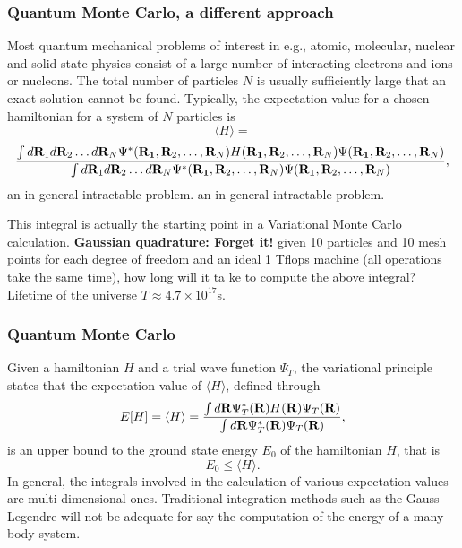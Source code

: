 \documentclass[compress]{beamer}
\begin{document}
\frame
{
  \frametitle{Quantum Monte Carlo, a different approach}
\begin{small}
{\scriptsize
Most quantum mechanical  
problems of interest in e.g., atomic, molecular, nuclear and solid state 
physics consist of a large number of 
interacting electrons and ions or nucleons. 
The total number of particles $N$ is usually sufficiently large
that an exact solution cannot be found. 
Typically, 
the expectation value for a chosen hamiltonian for a system of 
$N$ particles is
\[
   \langle H \rangle =
\]
\[
   \frac{\int d{\bf R}_1d{\bf R}_2\dots d{\bf R}_N
         \Psi^{\ast}({\bf R_1},{\bf R}_2,\dots,{\bf R}_N)
          H({\bf R_1},{\bf R}_2,\dots,{\bf R}_N)
          \Psi({\bf R_1},{\bf R}_2,\dots,{\bf R}_N)}
        {\int d{\bf R}_1d{\bf R}_2\dots d{\bf R}_N
        \Psi^{\ast}({\bf R_1},{\bf R}_2,\dots,{\bf R}_N)
        \Psi({\bf R_1},{\bf R}_2,\dots,{\bf R}_N)},
\]
an in general intractable problem.
an in general intractable problem.

 This integral is actually the starting point in a Variational Monte Carlo calculation.\newline
 {\bf Gaussian quadrature: Forget it!} given 10 particles and 10 mesh points for each degree of freedom
and an
 ideal 1 Tflops machine (all operations take the same time), how long will it ta
ke to compute the above integral? Lifetime of the universe $T\approx 4.7 \times
10^{17}$s.
}
\end{small}
}




\frame
{
  \frametitle{Quantum Monte Carlo}
\begin{small}
{\scriptsize
Given a hamiltonian $H$ and a trial
wave function $\Psi_T$, the variational principle states that
the expectation value of $\langle H \rangle$, defined through 
\[
   E[H]= \langle H \rangle =
   \frac{\int d{\bf R}\Psi^{\ast}_T({\bf R})H({\bf R})\Psi_T({\bf R})}
        {\int d{\bf R}\Psi^{\ast}_T({\bf R})\Psi_T({\bf R})},
\]
is an upper bound to the ground state energy $E_0$ of the hamiltonian $H$, that
is 
\[
    E_0 \le \langle H \rangle .
\]
In general, the integrals involved in the calculation of various  expectation
values  are multi-dimensional ones. Traditional integration methods
such as the Gauss-Legendre will not be adequate for say the 
computation of the energy of a many-body system.
}
\end{small}
}
\end{document}
